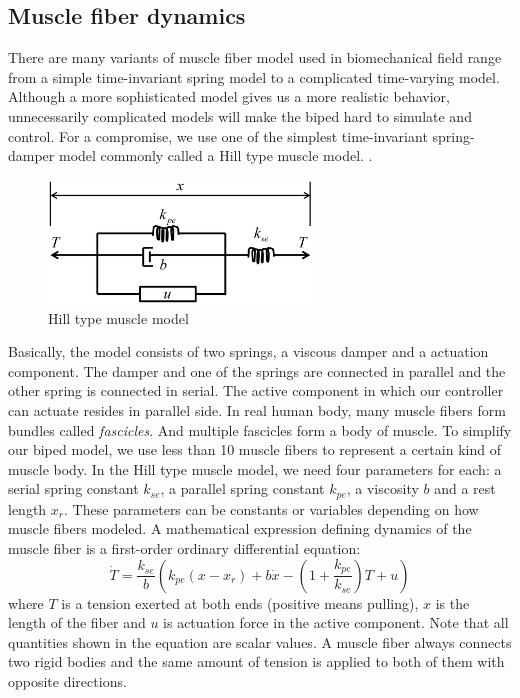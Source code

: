 \documentclass{acm_proc_article-sp}
\begin{document}
\subsection{Muscle fiber dynamics}

There are many variants of muscle fiber model used in biomechanical field range
from a simple time-invariant spring model to a complicated time-varying model. \cite{25733}
Although a more sophisticated model gives us a more realistic behavior, unnecessarily
complicated models will make the biped hard to simulate and control.
For a compromise, we use one of the simplest time-invariant spring-damper model commonly called
a Hill type muscle model. \cite{hill}.

\begin{figure}[h!]
  \centering
  \includegraphics[width=2.75in]{musclemodel}
  \caption{Hill type muscle model}
\end{figure}

\noindent Basically, the model consists of two springs, a viscous damper and a actuation component.
The damper and one of the springs are connected in parallel and the other spring is
connected in serial. The active component in which our controller
can actuate resides in parallel side.
In real human body, many muscle fibers form bundles called \emph{fascicles}.
And multiple fascicles form a body of muscle.
To simplify our biped model, we use less than 10 muscle fibers to represent a certain kind of muscle body.
In the Hill type muscle model, we need four parameters for each:
a serial spring constant $k_{se}$, a parallel spring constant $k_{pe}$, a viscosity $b$ and a rest length $x_{r}$.
These parameters can be constants or variables depending on how muscle fibers modeled.
A mathematical expression defining dynamics of the muscle fiber is a first-order ordinary differential equation:
\begin{equation}\label{Tension}
\dot{T} = \frac{k_{se}}{b} \left( k_{pe}(x-x_{r})+b\dot{x}-\left(1+\frac{k_{pe}}{k_{se}}\right)T+u   \right)
\end{equation}
where $T$ is a tension exerted at both ends (positive means pulling), $x$ is the length of the fiber and $u$ is actuation force in the active component.
Note that all quantities shown in the equation are scalar values.
A muscle fiber always connects two rigid bodies and the same amount of
tension is applied to both of them with opposite directions.
\end{document}
